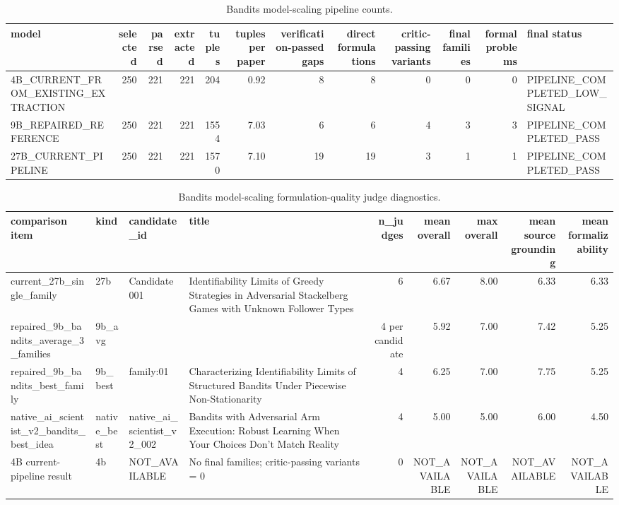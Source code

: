 \begin{table}[htbp]
\centering
\caption{Bandits model-scaling pipeline counts.}
\label{tab:model\_scaling\_counts}
\begin{tabular}{lrrrrrrrrrrl}
\toprule
model & selected & parsed & extracted & tuples & tuples per paper & verification-passed gaps & direct formulations & critic-passing variants & final families & formal problems & final status \\
\midrule
4B\_CURRENT\_FROM\_EXISTING\_EXTRACTION & 250 & 221 & 221 & 204 & 0.92 & 8 & 8 & 0 & 0 & 0 & PIPELINE\_COMPLETED\_LOW\_SIGNAL \\
9B\_REPAIRED\_REFERENCE & 250 & 221 & 221 & 1554 & 7.03 & 6 & 6 & 4 & 3 & 3 & PIPELINE\_COMPLETED\_PASS \\
27B\_CURRENT\_PIPELINE & 250 & 221 & 221 & 1570 & 7.10 & 19 & 19 & 3 & 1 & 1 & PIPELINE\_COMPLETED\_PASS \\
\bottomrule
\end{tabular}
\end{table}

\begin{table}[htbp]
\centering
\caption{Bandits model-scaling formulation-quality judge diagnostics.}
\label{tab:model\_scaling\_judge}
\begin{tabular}{llllrrrrr}
\toprule
comparison item & kind & candidate\_id & title & n\_judges & mean overall & max overall & mean source grounding & mean formalizability \\
\midrule
current\_27b\_single\_family & 27b & Candidate 001 & Identifiability Limits of Greedy Strategies in Adversarial Stackelberg Games with Unknown Follower Types & 6 & 6.67 & 8.00 & 6.33 & 6.33 \\
repaired\_9b\_bandits\_average\_3\_families & 9b\_avg &  &  & 4 per candidate & 5.92 & 7.00 & 7.42 & 5.25 \\
repaired\_9b\_bandits\_best\_family & 9b\_best & family:01 & Characterizing Identifiability Limits of Structured Bandits Under Piecewise Non-Stationarity & 4 & 6.25 & 7.00 & 7.75 & 5.25 \\
native\_ai\_scientist\_v2\_bandits\_best\_idea & native\_best & native\_ai\_scientist\_v2\_002 & Bandits with Adversarial Arm Execution: Robust Learning When Your Choices Don't Match Reality & 4 & 5.00 & 5.00 & 6.00 & 4.50 \\
4B current-pipeline result & 4b & NOT\_AVAILABLE & No final families; critic-passing variants = 0 & 0 & NOT\_AVAILABLE & NOT\_AVAILABLE & NOT\_AVAILABLE & NOT\_AVAILABLE \\
\bottomrule
\end{tabular}
\end{table}

